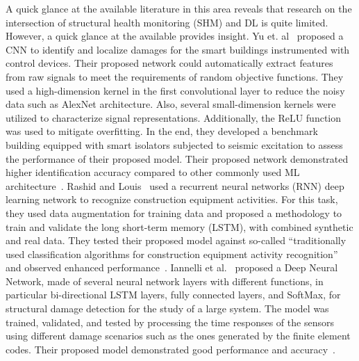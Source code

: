 \documentclass[10pt,twocolumn,letterpaper]{article}
\begin{document}
A quick glance at the available literature in this area reveals that research on the intersection of structural health monitoring (SHM) and DL is quite limited. However, a quick glance at the available provides insight. Yu et. al~\cite{Yu01} proposed a CNN to identify and localize damages for the smart buildings instrumented with control devices. Their proposed network could automatically extract features from raw signals to meet the requirements of random objective functions. They used a high-dimension kernel in the first convolutional layer to reduce the noisy data such as AlexNet architecture. Also, several small-dimension kernels were utilized to characterize signal representations. Additionally, the ReLU function was used to mitigate overfitting. In the end, they developed a benchmark building equipped with smart isolators subjected to seismic excitation to assess the performance of their proposed model. Their proposed network demonstrated higher identification accuracy compared to other commonly used ML architecture~\cite{Yu01}. Rashid and Louis~\cite{Rashid01} used a recurrent neural networks (RNN) deep learning network to recognize construction equipment activities. For this task, they used data augmentation for training data and proposed a methodology to train and validate the long short-term memory (LSTM), with combined synthetic and real data. They tested their proposed model against so-called “traditionally used classification algorithms for construction equipment activity recognition” and observed enhanced performance~\cite{Rashid01}. Iannelli et al.~\cite{Iannelli01} proposed a Deep Neural Network, made of several neural network layers with different functions, in particular bi-directional LSTM layers, fully connected layers, and SoftMax, for structural damage detection for the study of a large system. The model was trained, validated, and tested by processing the time responses of the sensors using different damage scenarios such as the ones generated by the finite element codes. Their proposed model demonstrated good performance and accuracy~\cite{Iannelli01}.
\end{document}
